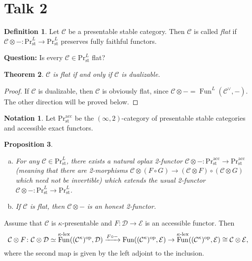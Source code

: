 \documentclass[draft]{amsart}
\newcommand{\cat}[1]{\mathcal{#1}}
\newcommand{\op}{\mathrm{op}}
\renewcommand{\Pr}{\mathrm{Pr}}
\newcommand{\blank}{-} %
\DeclareMathOperator{\Fun}{Fun}
\newtheorem{thm}{Theorem}[section]
\newtheorem{prop}[thm]{Proposition}
\theoremstyle{definition}
\newtheorem{defn}[thm]{Definition}
\newtheorem*{notation}{Notation}
\begin{document}
\section{Talk 2}

\begin{defn}
Let $\cat C$ be a presentable stable category. Then $\cat C$ is called \emph{flat} if $\cat C\otimes \blank \colon \Pr^L_{\mathrm{st}} \to \Pr^L_{\mathrm{st}}$ preserves fully faithful functors.
\end{defn}

\textbf{Question:} Is every $\cat C\in \Pr^L_{\mathrm{st}}$ flat?

\begin{thm}\label{Efimov:flat}
$\cat C$ is flat if and only if $\cat C$ is dualizable.
\end{thm}
\begin{proof}
If $\cat C$ is dualizable, then $\cat C$ is obviously flat, since $\cat C\otimes \blank = \Fun^L(\cat C^\vee, \blank)$. The other direction will be proved below.
\end{proof}

\begin{notation}
Let $\Pr^{\mathrm{acc}}_{\mathrm{st}}$ be the $(\infty,2)$-category of presentable stable categories and accessible exact functors.
\end{notation}

\begin{prop}
\begin{enumerate}[(a)]
\item For any $\cat C \in \Pr^L_{\mathrm{st}}$, there exists a natural oplax 2-functor $\cat C\otimes \blank \colon \Pr^{\mathrm{acc}}_{\mathrm{st}} \to \Pr^{\mathrm{acc}}_{\mathrm{st}}$ (meaning that there are 2-morphisms $\cat C\otimes (F\circ G) \to (\cat C\otimes F)\circ (\cat C\otimes G)$ which need not be invertible) which extends the usual 2-functor $\cat C\otimes \blank \colon \Pr^L_{\mathrm{st}} \to \Pr^L_{\mathrm{st}}$.

\item If $\cat C$ is flat, then $\cat C\otimes \blank$ is an honest 2-functor.
\end{enumerate}
\end{prop}

Assume that $\cat C$ is $\kappa$-presentable and $F\colon \cat D\to \cat E$ is an accessible functor. Then
\[
\cat C\otimes F\colon \cat C\otimes \cat D \simeq \Fun^{\textnormal{$\kappa$-lex}}((\cat C^\kappa)^\op, \cat D) \xrightarrow{F\circ \blank} \Fun((\cat C^\kappa)^\op, \cat E) \to \Fun^{\textnormal{$\kappa$-lex}}((\cat C^\kappa)^\op, \cat E) \cong \cat C\otimes \cat E,
\]
where the second map is given by the left adjoint to the inclusion.
\bigskip
\end{document}
